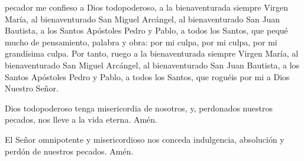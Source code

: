 pecador me confieso a Dios todopoderoso, a la bienaventurada siempre Virgen María, al bienaventurado San Miguel Arcángel,
al bienaventurado San Juan Bautista, a los Santos Apóstoles Pedro y Pablo, a todos los Santos, que pequé mucho
de pensamiento, palabra y obra: por mi culpa, por mi culpa, por mi grandísima culpa. Por tanto, ruego a la bienaventurada
siempre Virgen María, al bienaventurado San Miguel Arcángel, al bienaventurado San Juan Bautista, a los Santos Apóstoles
Pedro y Pablo, a todos los Santos, que roguéis por mi a Dios Nuestro Señor.

Dios todopoderoso tenga misericordia de nosotros, y, perdonados nuestros pecados, nos lleve a la vida eterna. Amén.

El Señor omnipotente y misericordioso nos conceda indulgencia, absolución y perdón de nuestros pecados. Amén.